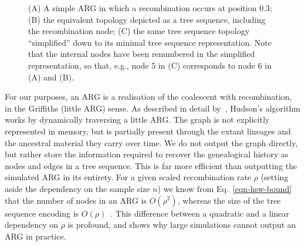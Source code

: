 \documentclass{article}
\begin{document}
\begin{figure}
\begin{subfigure}[t]{0.33\textwidth}
\end{subfigure}
\caption{\label{fig-arg} (A) A simple ARG in which a recombination
occurs at position 0.3; (B) the equivalent topology depicted as a tree
sequence, including the recombination node; (C) the same tree sequence
topology ``simplified'' down to its minimal tree sequence representation.
Note that the internal nodes have been renumbered in the simplified
representation, so that, e.g., node 5 in (C) corresponds to node 6 in
(A) and (B).}
\end{figure}

For our purposes, an ARG is a realisation of the coalescent with
recombination, in the Griffiths (little ARG) sense.
As described in detail by~\cite{kelleher2016efficient}, Hudson's algorithm
works by dynamically traversing a little ARG.
The graph is not explicitly represented in memory, but is partially
present through the extant lineages and the ancestral material they carry
over time. We do not output the graph directly, but
rather store the information required to recover the genealogical
history as nodes and edges in a tree sequence.
This is far more efficient than outputting the simulated ARG in its entirety.
For a given scaled recombination rate $\rho$
(setting aside the dependency on the sample size $n$)
we know from Eq.~\eqref{eqn-hsw-bound} that the number of nodes
in an ARG is $O(\rho^2)$,
whereas the size of the tree sequence encoding is
$O(\rho)$~\citep{kelleher2016efficient}.
This difference between a
quadratic and a linear dependency on $\rho$ is profound, and shows why
large simulations cannot output an ARG in practice.
\end{document}
